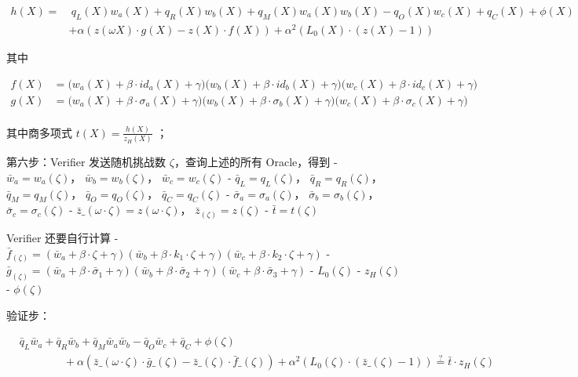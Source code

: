 \[
\begin{split}
h(X) = &\ q_L(X)w_a(X)+q_R(X)w_b(X)+ q_M(X)w_a(X)w_b(X) - q_O(X)w_c(X)+q_C(X) + \phi(X) \\
 & + \alpha(z(\omega X)\cdot g(X)-z(X)\cdot f(X)) + \alpha^2(L_0(X)\cdot(z(X)-1))
\end{split}
\]

其中

\[
\begin{split}
f(X)&=\Big(w_a(X)+\beta\cdot {id_a}(X)+\gamma\Big)\Big(w_b(X)+\beta\cdot {id_b}(X)+\gamma\Big)\Big(w_c(X)+\beta\cdot {id_c}(X)+\gamma\Big)\\
g(X)&=\Big(w_a(X)+\beta\cdot {\sigma_a}(X)+\gamma\Big)\Big(w_b(X)+\beta\cdot {\sigma_b}(X)+\gamma\Big)\Big(w_c(X)+\beta\cdot {\sigma_c}(X)+\gamma\Big)\\
\end{split}
\]

其中商多项式 \(t(X)=\frac{h(X)}{z_H(X)}\) ；

第六步：Verifier 发送随机挑战数 \(\zeta\)，查询上述的所有 Oracle，得到 -
\(\bar{w}_a=w_a(\zeta)\)， \(\bar{w}_b=w_b(\zeta)\)，
\(\bar{w}_c=w_c(\zeta)\) - \(\bar{q}_L=q_L(\zeta)\)，
\(\bar{q}_R=q_R(\zeta)\)， \(\bar{q}_M=q_M(\zeta)\)，
\(\bar{q}_O=q_O(\zeta)\)， \(\bar{q}_C=q_C(\zeta)\) -
\(\bar{\sigma}_a=\sigma_a(\zeta)\)，
\(\bar{\sigma}_b=\sigma_b(\zeta)\)， \(\bar{\sigma}_c=\sigma_c(\zeta)\)
- \(\bar{z}\_{(\omega\cdot\zeta)}=z(\omega\cdot\zeta)\)，
\(\bar{z}_{(\zeta)}=z(\zeta)\) - \(\bar{t}=t(\zeta)\)

Verifier 还要自行计算 -
\(\bar{f}_{(\zeta)} =(\bar{w}_a+\beta\cdot \zeta + \gamma) (\bar{w}_b+\beta\cdot k_1\cdot \zeta +\gamma)(\bar{w}_c+\beta\cdot k_2 \cdot \zeta +\gamma)\)
-
\(\bar{g}_{(\zeta)}=(\bar{w}_a+\beta\cdot \bar{\sigma}_1 + \gamma) (\bar{w}_b+\beta\cdot\bar{\sigma}_2+\gamma)(\bar{w}_c+\beta\cdot\bar{\sigma}_3+\gamma)\)
- \(L_0(\zeta)\) - \(z_H(\zeta)\) - \(\phi(\zeta)\)

验证步：

\[
\begin{split}
& \bar{q}_L\bar{w}_a+\bar{q}_R\bar{w}_b+ \bar{q}_M\bar{w}_a\bar{w}_b - \bar{q}_O\bar{w}_c+\bar{q}_C + \phi(\zeta)  \\
& \qquad \qquad + \alpha(\bar{z}\_{(\omega\cdot\zeta)}\cdot \bar{g}\_{(\zeta)}-\bar{z}\_{(\zeta)}\cdot \bar{f}\_{(\zeta)})+ \alpha^2(L_0(\zeta)\cdot(\bar{z}\_{(\zeta)}-1))\overset{?}{=}\bar{t}\cdot z_H(\zeta)
\end{split}
\]

